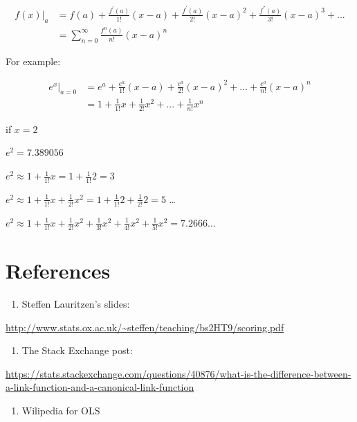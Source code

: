 \documentclass[]{book}
\providecommand{\tightlist}{%
  \setlength{\itemsep}{0pt}\setlength{\parskip}{0pt}}
\begin{document}
\[\begin{aligned}
f(x)|_{a} &=f(a)+\frac{f^{'}(a)}{1!}(x-a)+\frac{f^{'}(a)}{2!}(x-a)^2+\frac{f^{''}(a)}{3!}(x-a)^{3}+...\\&=\sum_{n=0}^{\infty} \frac{f^{n}(a)}{n!}(x-a)^n 
\end{aligned}\]

For example:

\[\begin{aligned} 
e^x |_{a=0} &= e^a+ \frac{e^a}{1!}(x-a)+\frac{e^a}{2!}(x-a)^2+...+\frac{e^a}{n!}(x-a)^n \\ 
&=  1+ \frac{1}{1!}x+\frac{1}{2!}x^2+...+\frac{1}{n!}x^n
\end{aligned}\]

if \(x=2\)

\(e^2 = 7.389056\)

\(e^2 \approx 1+\frac{1}{1!}x =1+\frac{1}{1!}2=3\)

\(e^2 \approx 1+\frac{1}{1!}x+\frac{1}{2!}x^2 =1+\frac{1}{1!}2 + \frac{1}{2!}2 =5\)
\ldots{}

\(e^2 \approx 1+\frac{1}{1!}x+\frac{1}{2!}x^2 +\frac{1}{3!}x^2+\frac{1}{4!}x^2+\frac{1}{5!}x^2=7.2666...\)

\hypertarget{references-1}{%
\section{References}\label{references-1}}

\begin{enumerate}
\def\labelenumi{\arabic{enumi}.}
\tightlist
\item
  Steffen Lauritzen's slides:
\end{enumerate}

\url{http://www.stats.ox.ac.uk/~steffen/teaching/bs2HT9/scoring.pdf}

\begin{enumerate}
\def\labelenumi{\arabic{enumi}.}
\setcounter{enumi}{1}
\tightlist
\item
  The Stack Exchange post:
\end{enumerate}

\url{https://stats.stackexchange.com/questions/40876/what-is-the-difference-between-a-link-function-and-a-canonical-link-function}

\begin{enumerate}
\def\labelenumi{\arabic{enumi}.}
\setcounter{enumi}{2}
\tightlist
\item
  Wilipedia for OLS
\end{enumerate}
\end{document}
